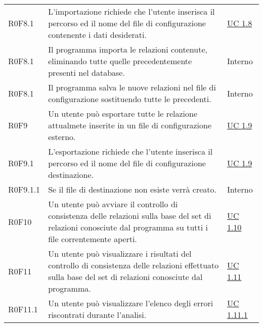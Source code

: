 \begin{center}
\begin{longtable}{p{4.2cm}!{\color{white}\vrule width 0.5mm}p{6cm}!{\color{white}\vrule width 0.5mm}p{2.5cm}!{\color{white}\vrule width 0.5mm}}
			\hspace{2mm}\hypertarget{XER0F8.1}{R0F8.1} & L'importazione richiede che l'utente inserisca il percorso ed il nome del file di configurazione contenente i dati desiderati. & \hyperref[subsec:XEUC1.8]{UC 1.8}\\
			
			\hspace{2mm}\hypertarget{XER0F8.1}{R0F8.1} & Il programma importa le relazioni contenute, eliminando tutte quelle precedentemente presenti nel database. & Interno\\
		
			\hspace{2mm}\hypertarget{XER0F8.1}{R0F8.1} & Il programma salva le nuove relazioni nel file di configurazione sostituendo tutte le precedenti. & Interno\\
			
		
		\hspace{0mm}\hypertarget{XER0F9}{R0F9} & Un utente può esportare tutte le relazione attualmete inserite in un file di configurazione esterno. & \hyperref[subsec:XEUC1.9]{UC 1.9}\\
			\hspace{2mm}\hypertarget{XER0F9.1}{R0F9.1} & L'esportazione richiede che l'utente inserisca il percorso ed il nome del file di configurazione destinazione. & \hyperref[subsec:XEUC1.9]{UC 1.9}\\
			
				\hspace{2mm}\hypertarget{XER0F9.1.1}{R0F9.1.1} & Se il file di destinazione non esiste verrà creato. & Interno\\
		
		
		\hspace{0mm}\hypertarget{XER0F10}{R0F10} & Un utente può avviare il controllo di consistenza delle relazioni sulla base del set di relazioni conosciute dal programma su tutti i file correntemente aperti. & \hyperref[subsec:XEUC1.10]{UC 1.10}\\
			
		\hspace{0mm}\hypertarget{XER0F11}{R0F11} & Un utente può visualizzare i risultati del controllo di consistenza delle relazioni effettuato sulla base del set di relazioni conosciute dal programma. & \hyperref[subsec:XEUC1.11]{UC 1.11}\\
			
			\hspace{2mm}\hypertarget{XER0F11.1}{R0F11.1} & Un utente può visualizzare l'elenco degli errori riscontrati durante l'analisi. & \hyperref[subsec:XEUC1.11.1]{UC 1.11.1}\\
			

\end{longtable}
\end{center}
